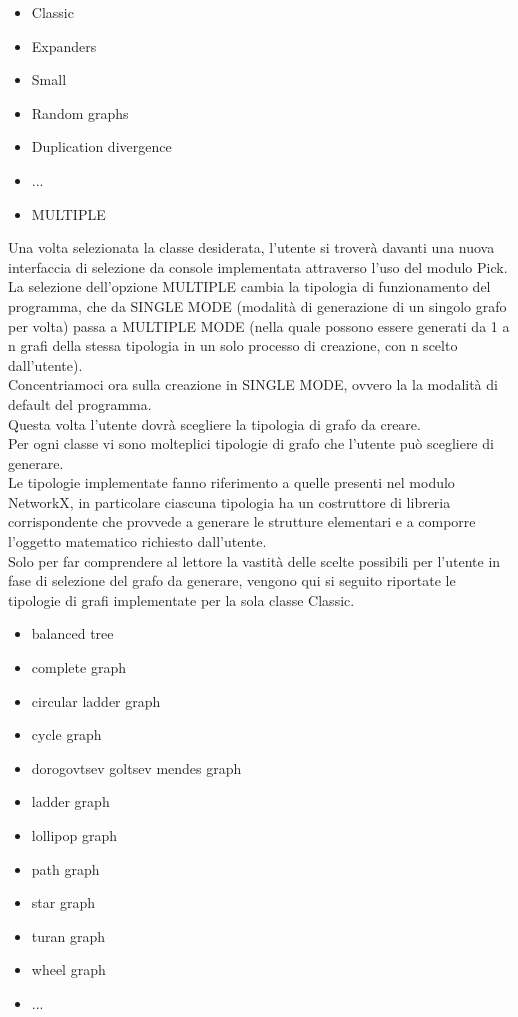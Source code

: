 \begin{itemize}
	\item Classic
	\item Expanders
	\item Small 
	\item Random graphs 
	\item Duplication divergence 
	\item ...
	\item MULTIPLE
\end{itemize}

Una volta selezionata la classe desiderata, l'utente si troverà davanti una nuova interfaccia di selezione da console implementata attraverso l'uso del modulo Pick.\\

La selezione dell'opzione MULTIPLE cambia la tipologia di funzionamento del programma, che da SINGLE MODE (modalità di generazione di un singolo grafo per volta) passa a MULTIPLE MODE (nella quale possono essere generati da 1 a n grafi della stessa tipologia in un solo processo di creazione, con n scelto dall'utente).\\
Concentriamoci ora sulla creazione in SINGLE MODE, ovvero la la modalità di default del programma.\\

Questa volta l'utente dovrà scegliere la tipologia di grafo da creare.\\
Per ogni classe vi sono molteplici tipologie di grafo che l'utente può scegliere di generare.\\

Le tipologie implementate fanno riferimento a quelle presenti nel modulo NetworkX, in particolare ciascuna tipologia ha un costruttore di libreria corrispondente che provvede a generare le strutture elementari e a comporre l'oggetto matematico richiesto dall'utente.\\

Solo per far comprendere al lettore la vastità delle scelte possibili per l'utente in fase di selezione del grafo da generare, vengono qui si seguito riportate le tipologie di grafi implementate per la sola classe Classic.

\begin{itemize}
	\item balanced tree
	\item complete graph
	\item circular ladder graph
	\item cycle graph
	\item dorogovtsev goltsev mendes graph
	\item ladder graph
	\item lollipop graph
	\item path graph
	\item star graph
	\item turan graph
	\item wheel graph
	\item ...
\end{itemize}

